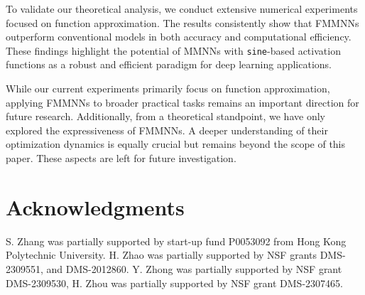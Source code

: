 \documentclass[11pt,a4paper]{article}
\begin{document}
To validate our theoretical analysis, we conduct extensive numerical experiments focused on function approximation. The results consistently show that FMMNNs outperform conventional models in both accuracy and computational efficiency. These findings highlight the potential of MMNNs with \texttt{sine}-based activation functions as a robust and efficient paradigm for deep learning applications.

While our current experiments primarily focus on function approximation, applying FMMNNs to broader practical tasks remains an important direction for future research. Additionally, from a theoretical standpoint, we have only explored the expressiveness of FMMNNs. A deeper understanding of their optimization dynamics is equally crucial but remains beyond the scope of this paper. These aspects are left for future investigation.


\section*{Acknowledgments}
S. Zhang was partially supported by
start-up fund  P0053092  from 
Hong Kong Polytechnic University.
H. Zhao was partially supported by NSF grants DMS-2309551, and DMS-2012860. Y. Zhong was partially supported by NSF grant DMS-2309530, H. Zhou was partially supported by NSF grant DMS-2307465.





\hypersetup{colorlinks=true,citecolor=black,linkcolor=black,urlcolor=black}
\renewcommand{\doi}[1]{\textnormal{\doitext}~\texttt{\href{https://doi.org/#1}{#1}}}

% 

%    
  

\end{document}
